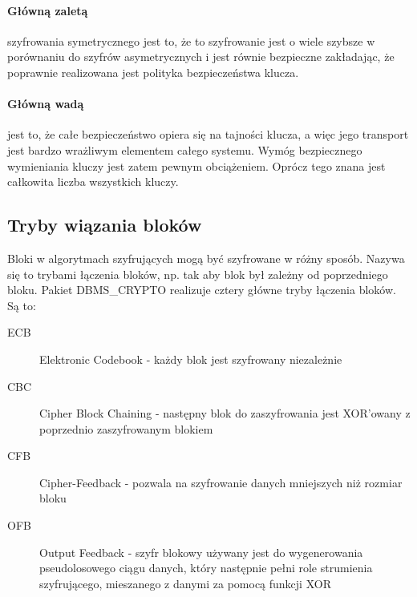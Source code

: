 \documentclass[12pt, a4paper]{article}
\begin{document}
\paragraph{ Główną zaletą} szyfrowania symetrycznego jest to, że to
szyfrowanie jest o wiele szybsze w porównaniu do szyfrów asymetrycznych i
jest równie bezpieczne zakładając, że poprawnie realizowana jest
polityka bezpieczeństwa klucza.


\paragraph{ Główną wadą} jest to, że całe bezpieczeństwo opiera się
na tajności klucza, a więc jego transport jest bardzo wrażliwym
elementem całego systemu. Wymóg bezpiecznego wymieniania kluczy jest
zatem pewnym obciążeniem. Oprócz tego znana jest całkowita liczba
wszystkich kluczy.



\subsection{Tryby wiązania bloków}
Bloki w algorytmach szyfrujących mogą być szyfrowane w różny sposób.
Nazywa się to trybami łączenia bloków, np. tak aby blok był zależny
od poprzedniego bloku. Pakiet DBMS\_CRYPTO realizuje cztery główne tryby
łączenia bloków.
Są to:

\begin{description}
\item[ECB] Elektronic Codebook - każdy blok jest szyfrowany niezależnie
\item[CBC] Cipher Block Chaining - następny blok do zaszyfrowania jest
XOR'owany z poprzednio zaszyfrowanym blokiem
\item[CFB] Cipher-Feedback - pozwala na szyfrowanie danych mniejszych niż
rozmiar bloku
\item[OFB] Output Feedback - szyfr blokowy używany jest do wygenerowania
pseudolosowego ciągu danych, który następnie pełni role strumienia
szyfrującego, mieszanego z danymi za pomocą funkcji XOR
\end{description}

\end{document}
